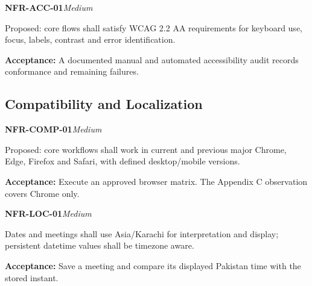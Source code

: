 \documentclass[12pt,a4paper,oneside]{report}
\begin{document}
\noindent\begin{minipage}{\linewidth}\textbf{NFR-ACC-01}\hfill\textit{Medium}\par\nopagebreak

Proposed: core flows shall satisfy WCAG 2.2 AA requirements for keyboard use, focus, labels, contrast and error identification.

{\color{muted}\textbf{Acceptance:} A documented manual and automated accessibility audit records conformance and remaining failures.\par}\end{minipage}\par\vspace{5pt}


\subsection{Compatibility and Localization}

\noindent\begin{minipage}{\linewidth}\textbf{NFR-COMP-01}\hfill\textit{Medium}\par\nopagebreak

Proposed: core workflows shall work in current and previous major Chrome, Edge, Firefox and Safari, with defined desktop/mobile versions.

{\color{muted}\textbf{Acceptance:} Execute an approved browser matrix. The Appendix C observation covers Chrome only.\par}\end{minipage}\par\vspace{5pt}

\noindent\begin{minipage}{\linewidth}\textbf{NFR-LOC-01}\hfill\textit{Medium}\par\nopagebreak

Dates and meetings shall use Asia/Karachi for interpretation and display; persistent datetime values shall be timezone aware.

{\color{muted}\textbf{Acceptance:} Save a meeting and compare its displayed Pakistan time with the stored instant.\par}\end{minipage}\par\vspace{5pt}
\end{document}
